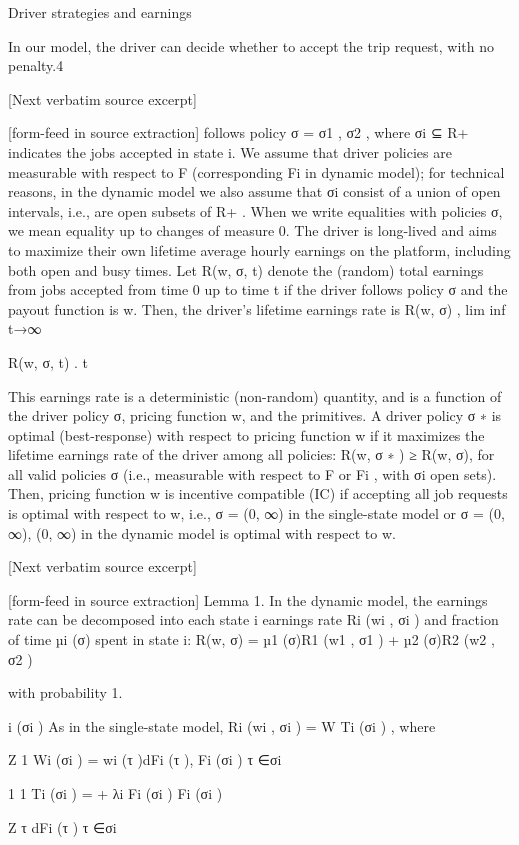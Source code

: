 \documentclass[10pt]{article}
\begin{document}
\begin{ReviewVerbatim}
Driver strategies and earnings

In our model, the driver can decide whether to accept the trip request, with no penalty.4

[Next verbatim source excerpt]


[form-feed in source extraction]
follows policy σ = {σ1 , σ2 }, where σi ⊆ R+ indicates the jobs accepted in state i. We assume that
driver policies are measurable with respect to F (corresponding Fi in dynamic model); for technical
reasons, in the dynamic model we also assume that σi consist of a union of open intervals, i.e., are
open subsets of R+ . When we write equalities with policies σ, we mean equality up to changes of
measure 0.
The driver is long-lived and aims to maximize their own lifetime average hourly earnings on the
platform, including both open and busy times. Let R(w, σ, t) denote the (random) total earnings
from jobs accepted from time 0 up to time t if the driver follows policy σ and the payout function
is w. Then, the driver’s lifetime earnings rate is
R(w, σ) , lim inf t→∞

R(w, σ, t)
.
t

This earnings rate is a deterministic (non-random) quantity, and is a function of the driver policy
σ, pricing function w, and the primitives.
A driver policy σ ∗ is optimal (best-response) with respect to pricing function w if it maximizes
the lifetime earnings rate of the driver among all policies: R(w, σ ∗ ) ≥ R(w, σ), for all valid policies
σ (i.e., measurable with respect to F or Fi , with σi open sets). Then, pricing function w is incentive
compatible (IC) if accepting all job requests is optimal with respect to w, i.e., σ = (0, ∞) in
the single-state model or σ = {(0, ∞), (0, ∞)} in the dynamic model is optimal with respect to w.

[Next verbatim source excerpt]


[form-feed in source extraction]
Lemma 1. In the dynamic model, the earnings rate can be decomposed into each state i earnings
rate Ri (wi , σi ) and fraction of time µi (σ) spent in state i:
R(w, σ) = µ1 (σ)R1 (w1 , σ1 ) + µ2 (σ)R2 (w2 , σ2 )

with probability 1.

i (σi )
As in the single-state model, Ri (wi , σi ) = W
Ti (σi ) , where

Z
1
Wi (σi ) =
wi (τ )dFi (τ ),
Fi (σi ) τ ∈σi

1
1
Ti (σi ) =
+
λi Fi (σi ) Fi (σi )

Z
τ dFi (τ )
τ ∈σi


\end{ReviewVerbatim}
\end{document}

